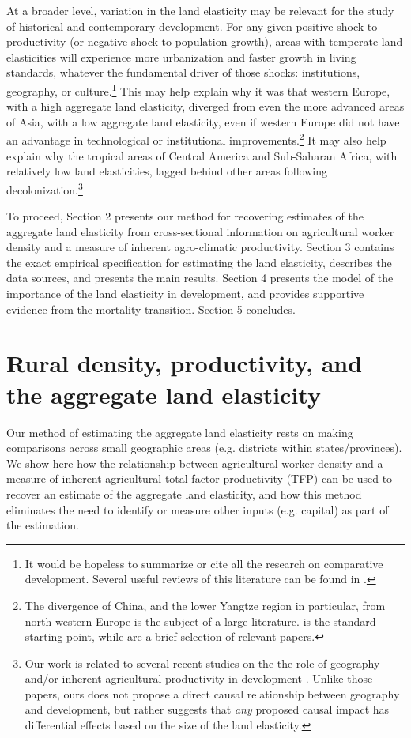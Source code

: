 \documentclass[11pt]{article}
\begin{document}
At a broader level, variation in the land elasticity may be relevant for the study of historical and contemporary development. For any given positive shock to productivity (or negative shock to population growth), areas with temperate land elasticities will experience more urbanization and faster growth in living standards, whatever the fundamental driver of those shocks: institutions, geography, or culture.\footnote{It would be hopeless to summarize or cite all the research on comparative development. Several useful reviews of this literature can be found in \cite{ajr2005handbook,nunn_2009,Galor:2011uq,sw2013,vries2013}.} This may help explain why it was that western Europe, with a high aggregate land elasticity, diverged from even the more advanced areas of Asia, with a low aggregate land elasticity, even if western Europe did not have an advantage in technological or institutional improvements.\footnote{The divergence of China, and the lower Yangtze region in particular, from north-western Europe is the subject of a large literature. \citet{pom2000} is the standard starting point, while \citet{allen11,huang2002,ma2013,lee2002,bg2006} are a brief selection of relevant papers.} It may also help explain why the tropical areas of Central America and Sub-Saharan Africa, with relatively low land elasticities, lagged behind other areas following decolonization.\footnote{Our work is related to several recent studies on the the role of geography and/or inherent agricultural productivity in development \citep{oh2005,ashraf2010dynamics,Nunn2011,Nunn2012,mich2012,agn2013,cook14,cook2014role,fenske2014,alsan2015,ashrafmich2015,dks2015,galorozak2016,litina2016,ads2016,FrankemaPap2017}. Unlike those papers, ours does not propose a direct causal relationship between geography and development, but rather suggests that \textit{any} proposed causal impact has differential effects based on the size of the land elasticity.} 

To proceed, Section 2 presents our method for recovering estimates of the aggregate land elasticity from cross-sectional information on agricultural worker density and a measure of inherent agro-climatic productivity. Section 3 contains the exact empirical specification for estimating the land elasticity, describes the data sources, and presents the main results. Section 4 presents the model of the importance of the land elasticity in development, and provides supportive evidence from the mortality transition. Section 5 concludes.

\section{Rural density, productivity, and the aggregate land elasticity}\label{SEC_agmodel}
Our method of estimating the aggregate land elasticity rests on making comparisons across small geographic areas (e.g. districts within states/provinces). We show here how the relationship between agricultural worker density and a measure of inherent agricultural total factor productivity (TFP) can be used to recover an estimate of the aggregate land elasticity, and how this method eliminates the need to identify or measure other inputs (e.g. capital) as part of the estimation.
\end{document}
